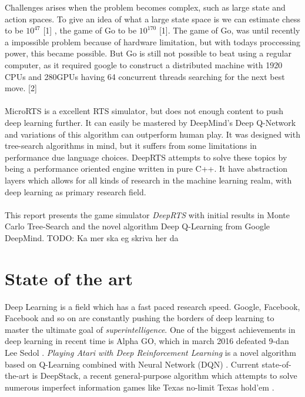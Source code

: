 \documentclass[fleqn,10pt]{article} %
\newcommand{\todo}[1]{}
\renewcommand{\todo}[1]{{\color{red} TODO: {#1}}}
\begin{document}
Challenges arises when the problem becomes complex, such as large state and action spaces. To give an idea of what a large state space is we can estimate chess to be $10^{47}$ [1] , the game of Go to be $10^{170}$ [1]. The game of Go, was until recently a impossible problem because of hardware limitation, but with todays proccessing power, this became possible. But Go is still not possible to beat using a regular computer, as it required google to construct a distributed machine with 1920 CPUs and 280GPUs having 64 concurrent threads  searching for the next best move. [2]
\\
\\
MicroRTS is a excellent RTS simulator, but does not enough content to push deep learning further. It can easily be mastered by DeepMind's Deep Q-Network and variations of this algorithm can outperform human play. It was designed with tree-search algorithms in mind, but it suffers from some limitations in performance due language choices. DeepRTS attempts to solve these topics by being a performance oriented engine written in pure C++. It have abstraction layers which allows for all kinds of research in the machine learning realm, with deep learning as primary research field.
\\
\\
This report presents the game simulator \textit{DeepRTS} with initial results in Monte Carlo Tree-Search and the novel algorithm Deep Q-Learning from Google DeepMind. \todo{Ka mer ska eg skriva her da}
\section{State of the art} %
Deep Learning is a field which has a fast paced research speed. Google, Facebook, Facebook and so on are constantly pushing the borders of deep learning to master the ultimate goal of \textit{superintelligence}. One of the biggest achievements in deep learning in recent time is Alpha GO, which in march 2016 defeated 9-dan Lee Sedol \cite{Silver_2016}. \textit{Playing Atari with Deep Reinforcement Learning} is a novel algorithm based on Q-Learning combined with Neural Network (DQN) \cite{DBLP:journals/corr/MnihKSGAWR13}. Current state-of-the-art is DeepStack, a recent general-purpose algorithm which attempts to solve numerous imperfect information games like Texas no-limit Texas hold’em \cite{DBLP:journals/corr/MoravcikSBLMBDW17}.
\end{document}
